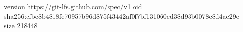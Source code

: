 version https://git-lfs.github.com/spec/v1
oid sha256:cfbc8b4818fe70957b96d875f43442af0f7bf131060ed38d93b0078c8d4ae29e
size 218448
